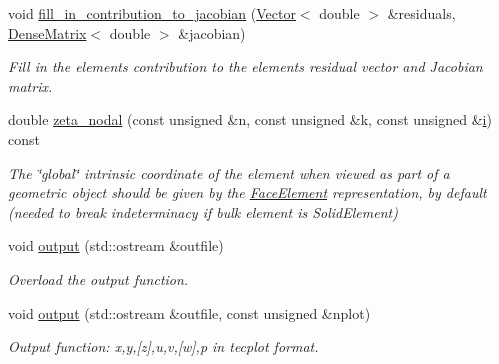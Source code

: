 \begin{DoxyCompactItemize}
void \hyperlink{classoomph_1_1NavierStokesImpedanceTractionElement_a708121c1a4224d0d2c572904f74f2fb6}{fill\+\_\+in\+\_\+contribution\+\_\+to\+\_\+jacobian} (\hyperlink{classoomph_1_1Vector}{Vector}$<$ double $>$ \&residuals, \hyperlink{classoomph_1_1DenseMatrix}{Dense\+Matrix}$<$ double $>$ \&jacobian)
\begin{DoxyCompactList}\small\item\em Fill in the element\textquotesingle{}s contribution to the element\textquotesingle{}s residual vector and Jacobian matrix. \end{DoxyCompactList}\item 
double \hyperlink{classoomph_1_1NavierStokesImpedanceTractionElement_a3be6b5b3152e35c76339a5de6ec1e93a}{zeta\+\_\+nodal} (const unsigned \&n, const unsigned \&k, const unsigned \&\hyperlink{cfortran_8h_adb50e893b86b3e55e751a42eab3cba82}{i}) const
\begin{DoxyCompactList}\small\item\em The \char`\"{}global\char`\"{} intrinsic coordinate of the element when viewed as part of a geometric object should be given by the \hyperlink{classoomph_1_1FaceElement}{Face\+Element} representation, by default (needed to break indeterminacy if bulk element is Solid\+Element) \end{DoxyCompactList}\item 
void \hyperlink{classoomph_1_1NavierStokesImpedanceTractionElement_a43b61cca808fed11ace680439488c3df}{output} (std\+::ostream \&outfile)
\begin{DoxyCompactList}\small\item\em Overload the output function. \end{DoxyCompactList}\item 
void \hyperlink{classoomph_1_1NavierStokesImpedanceTractionElement_a11722da061d3972b24932181b2ef9ae4}{output} (std\+::ostream \&outfile, const unsigned \&nplot)
\begin{DoxyCompactList}\small\item\em Output function\+: x,y,\mbox{[}z\mbox{]},u,v,\mbox{[}w\mbox{]},p in tecplot format. \end{DoxyCompactList}\end{DoxyCompactItemize}
